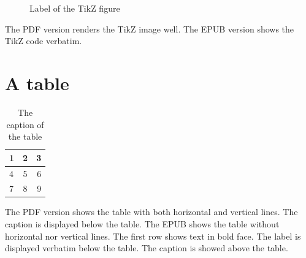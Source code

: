 \documentclass[ebook,12pt,oneside,openany]{memoir}
\begin{document}
\begin{figure}[H]
  \centering
  \caption{Label of the TikZ figure}
  \label{fig:tikz}
\end{figure}

The PDF version renders the TikZ image well.
The EPUB version shows the TikZ code verbatim.

\section{A table}

\begin{table}[H]
  \begin{tabular}{ | l || c | r | }
    \hline                       
    1 & 2 & 3 \\
    \hline                       
    \hline                       
    4 & 5 & 6 \\
    7 & 8 & 9 \\
    \hline  
  \end{tabular}
  \label{tbl:my_table}
  \caption{The caption of the table}
\end{table}

The PDF version shows the table with both horizontal and vertical lines. The caption is displayed below the table.
The EPUB shows the table without horizontal nor vertical lines. The first row shows text in bold face. The label is displayed verbatim below the table. The caption is showed above the table.



\end{document}
